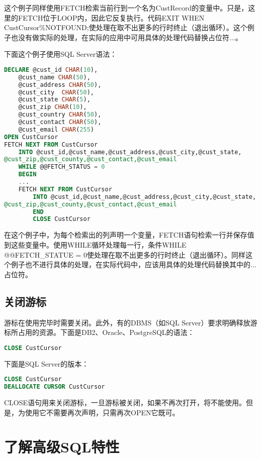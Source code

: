 这个例子同样使用FETCH检索当前行到一个名为CustRecord的变量中。只是，这里的FETCH位于LOOP内，因此它反复执行。代码EXIT WHEN CustCursor\%NOTFOUND;使处理在取不出更多的行时终止（退出循环）。这个例子也没有做实际的处理，在实际的应用中可用具体的处理代码替换占位符...。


下面这个例子使用SQL Server语法：

\begin{lstlisting}[language=SQL]
DECLARE @cust_id CHAR(10),
	@cust_name CHAR(50),
	@cust_address CHAR(50),
	@cust_city	CHAR(50),
	@cust_state CHAR(5),
	@cust_zip CHAR(10),
	@cust_country CHAR(50),
	@cust_contact CHAR(50),
	@cust_email CHAR(255)
OPEN CustCursor
FETCH NEXT FROM CustCursor
	INTO @cust_id,@cust_name,@cust_address,@cust_city,@cust_state,
@cust_zip,@cust_county,@cust_contact,@cust_email
	WHILE @@FETCH_STATUS = 0
	BEGIN
	...
	FETCH NEXT FROM CustCursor
		INTO @cust_id,@cust_name,@cust_address,@cust_city,@cust_state,
@cust_zip,@cust_county,@cust_contact,@cust_email
		END
		CLOSE CustCursor
\end{lstlisting}		
		
在这个例子中，为每个检索出的列声明一个变量，FETCH语句检索一行并保存值到这些变量中。使用WHILE循环处理每一行，条件WHILE @@FETCH\_STATUE = 0使处理在取不出更多的行时终止（退出循环）。同样这个例子也不进行具体的处理，在实际代码中，应该用具体的处理代码替换其中的...占位符。


\subsection{关闭游标}


游标在使用完毕时需要关闭。此外，有的DBMS（如SQL Server）要求明确释放游标所占用的资源。下面是DB2、Oracle、PostgreSQL的语法：

\begin{lstlisting}[language=SQL]
CLOSE CustCursor
\end{lstlisting}

下面是SQL Server的版本：

\begin{lstlisting}[language=SQL]
CLOSE CustCursor
DEALLOCATE CURSOR CustCursor
\end{lstlisting}


CLOSE语句用来关闭游标，一旦游标被关闭，如果不再次打开，将不能使用。但是，为使用它不需要再次声明，只需再次OPEN它既可。



\section{了解高级SQL特性}

